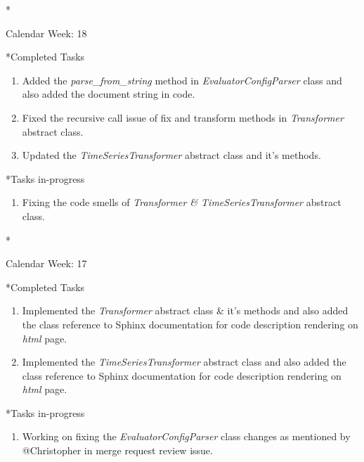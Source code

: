 \documentclass[11pt,a4paper]{article}
\begin{document}
\newpage
\begin{section}*{Calendar Week: 18 \hfill \date{07 May, 2021}}
 \begin{subsection}*{Completed Tasks}
     \begin{enumerate}
         \item Added the \textit{parse\_from\_string} method in \textit{EvaluatorConfigParser} class and also added the document string in code.
         \item Fixed the recursive call issue of fix and transform methods in \textit{Transformer} abstract class.
         \item Updated the \textit{TimeSeriesTransformer} abstract class and it's methods.
     \end{enumerate}
 \end{subsection}
 \begin{subsection}*{Tasks in-progress}
     \begin{enumerate}
         \item Fixing the code smells of \textit{Transformer \& TimeSeriesTransformer} abstract class.
     \end{enumerate}
 \end{subsection}
\end{section}

\newpage
\begin{section}*{Calendar Week: 17 \hfill \date{30 April, 2021}}
 \begin{subsection}*{Completed Tasks}
     \begin{enumerate}
         \item Implemented the \textit{Transformer} abstract class \& it's methods and also added the class reference to Sphinx documentation for code description rendering on \textit{html} page.
         \item Implemented the \textit{TimeSeriesTransformer} abstract class and also added the class reference to Sphinx documentation for code description rendering on \textit{html} page.
     \end{enumerate}
 \end{subsection}
 \begin{subsection}*{Tasks in-progress}
     \begin{enumerate}
         \item Working on fixing the \textit{EvaluatorConfigParser} class changes as mentioned by @Christopher in merge request review issue.
     \end{enumerate}
 \end{subsection}
\end{section}
\end{document}
